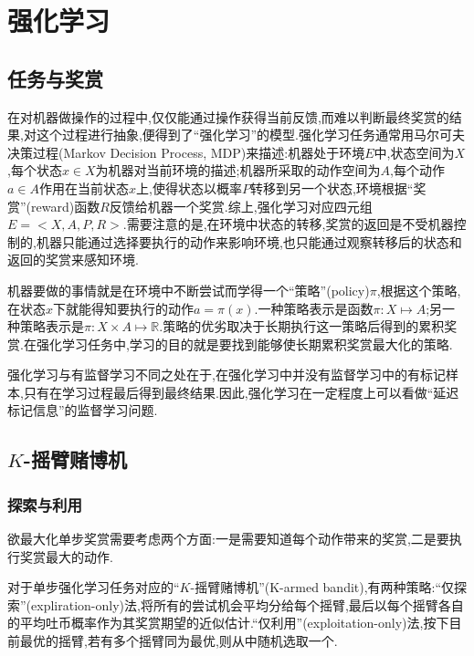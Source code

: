 \chapter{强化学习}

\section{任务与奖赏}

在对机器做操作的过程中,仅仅能通过操作获得当前反馈,而难以判断最终奖赏的结果,对这个过程进行抽象,便得到了``强化学习''的模型.强化学习任务通常用马尔可夫决策过程(Markov Decision Process, MDP)来描述:机器处于环境$E$中,状态空间为$X$,每个状态$x\in X$为机器对当前环境的描述;机器所采取的动作空间为$A$,每个动作$a\in A$作用在当前状态$x$上,使得状态以概率$P$转移到另一个状态,环境根据``奖赏''(reward)函数$R$反馈给机器一个奖赏.综上,强化学习对应四元组$E=<X,A,P,R>$.需要注意的是,在环境中状态的转移,奖赏的返回是不受机器控制的,机器只能通过选择要执行的动作来影响环境,也只能通过观察转移后的状态和返回的奖赏来感知环境.

机器要做的事情就是在环境中不断尝试而学得一个``策略''(policy)$\pi$,根据这个策略,在状态$x$下就能得知要执行的动作$a=\pi(x)$.一种策略表示是函数$\pi:X\mapsto A$;另一种策略表示是$\pi:X\times A\mapsto \mathbb R$.策略的优劣取决于长期执行这一策略后得到的累积奖赏.在强化学习任务中,学习的目的就是要找到能够使长期累积奖赏最大化的策略.

强化学习与有监督学习不同之处在于,在强化学习中并没有监督学习中的有标记样本,只有在学习过程最后得到最终结果.因此,强化学习在一定程度上可以看做``延迟标记信息''的监督学习问题.

\section{$K$-摇臂赌博机}

\subsection{探索与利用}

欲最大化单步奖赏需要考虑两个方面:一是需要知道每个动作带来的奖赏,二是要执行奖赏最大的动作.

对于单步强化学习任务对应的``$K$-摇臂赌博机''(K-armed bandit),有两种策略:``仅探索''(expliration-only)法,将所有的尝试机会平均分给每个摇臂,最后以每个摇臂各自的平均吐币概率作为其奖赏期望的近似估计.``仅利用''(exploitation-only)法,按下目前最优的摇臂,若有多个摇臂同为最优,则从中随机选取一个.

